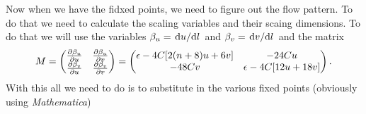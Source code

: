 \documentclass[11pt,letter, swedish, english
]{article}
\begin{document}
Now when we have the fidxed points, we need to figure out the flow
pattern. To do that we need to calculate the scaling variables and
their scaing dimensions. To do that we will use the variables
$\beta_u=\dv*{u}{l}$ and $\beta_v=\dv*{v}{l}$ and the matrix
\begin{equation}
M=
\begin{pmatrix}
\pdv{\beta_u}{u} & \pdv{\beta_u}{v} \\
\pdv{\beta_v}{u} & \pdv{\beta_v}{v} 
\end{pmatrix}
=
\begin{pmatrix}
\epsilon-4C[2(n+8)u +6v] & -24Cu \\
 -48Cv & \epsilon-4C[12u +18v]
\end{pmatrix}.
\end{equation}
With this all we need to do is to substitute in the various fixed
points (obviously using \textit{Mathematica})
\end{document}
